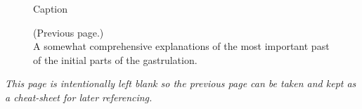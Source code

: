 \begin{figure}[H]
    \centering
    \vspace*{-1cm}
    \caption{Caption}
    \label{fig:big-timeline}
\end{figure}
\newpage
\addtocounter{figure}{-1}
\begin{figure} [t!]
  \caption{(Previous page.) \\ A somewhat comprehensive explanations of the most important past of the initial parts of the gastrulation.
  }
\end{figure}
\vspace*{5cm} 
\textit{This page is intentionally left blank so the previous page can be taken and kept as a cheat-sheet for later referencing. }
\newpage
